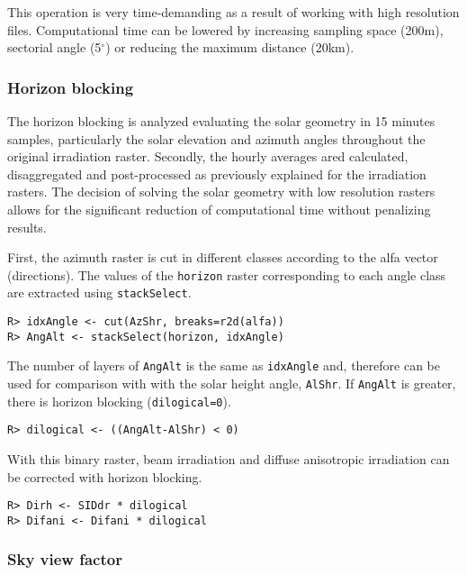 \documentclass[authoryear, sort&compress]{elsarticle}
\begin{document}
This operation is very time-demanding as a result of working with high
resolution files. Computational time can be lowered by increasing
sampling space (200m), sectorial angle (5$^\circ$) or reducing the
maximum distance (20km).


\subsubsection{Horizon blocking}
\label{sec-1-5-2}

The horizon blocking is analyzed evaluating the solar geometry in 15
minutes samples, particularly the solar elevation and azimuth angles
throughout the original irradiation raster. Secondly, the hourly
averages ared calculated, disaggregated and post-processed as
previously explained for the irradiation rasters. The decision of
solving the solar geometry with low resolution rasters allows for the
significant reduction of computational time without penalizing
results.

First, the azimuth raster is cut in different classes according to the
alfa vector (directions). The values of the \texttt{horizon} raster
corresponding to each angle class are extracted using
\texttt{stackSelect}.

\lstset{language=R,numbers=none}
\begin{lstlisting} 
R> idxAngle <- cut(AzShr, breaks=r2d(alfa))
R> AngAlt <- stackSelect(horizon, idxAngle)
\end{lstlisting}


The number of layers of \texttt{AngAlt} is the same as \texttt{idxAngle}
and, therefore can be used for comparison with with the solar height
angle, \texttt{AlShr}. If \texttt{AngAlt} is greater, there is horizon
blocking (\texttt{dilogical=0}).

\lstset{language=R,numbers=none}
\begin{lstlisting} 
R> dilogical <- ((AngAlt-AlShr) < 0)
\end{lstlisting}

With this binary raster, beam irradiation and diffuse anisotropic
irradiation can be corrected with horizon blocking.
\lstset{language=R,numbers=none}
\begin{lstlisting} 
R> Dirh <- SIDdr * dilogical
R> Difani <- Difani * dilogical
\end{lstlisting}

\subsubsection{Sky view factor}
\label{sec-1-5-3}
\end{document}
